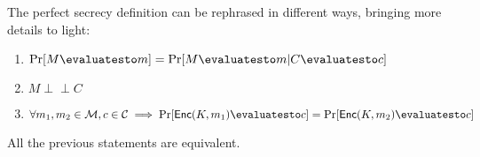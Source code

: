 The perfect secrecy definition can be rephrased in different ways, bringing more details to light:
\begin{enumerate}
    \item $\Pr[M \evaluatesto m] = \Pr[M \evaluatesto m|C \evaluatesto c]$
    \item $M \mathrel{\perp\!\!\!\!\perp} C$ %
    \item $\forall m_1, m_2 \in \M, c \in \C \implies \Pr[\textsf{Enc}(K, m_1) \evaluatesto c] = \Pr[\textsf{Enc}(K, m_2) \evaluatesto c]$
\end{enumerate}
    
\begin{proposition}
    All the previous statements are equivalent.
\end{proposition}

